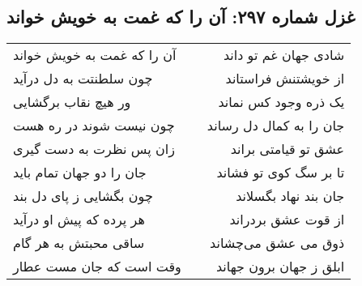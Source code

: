 \begin{center}
\section*{غزل شماره ۲۹۷: آن را که غمت به خویش خواند}
\label{sec:297}
\begin{longtable}{l p{0.5cm} r}
آن را که غمت به خویش خواند
&&
شادی جهان غم تو داند
\\
چون سلطنتت به دل درآید
&&
از خویشتنش فراستاند
\\
ور هیچ نقاب برگشایی
&&
یک ذره وجود کس نماند
\\
چون نیست شوند در ره هست
&&
جان را به کمال دل رساند
\\
زان پس نظرت به دست گیری
&&
عشق تو قیامتی براند
\\
جان را دو جهان تمام باید
&&
تا بر سگ کوی تو فشاند
\\
چون بگشایی ز پای دل بند
&&
جان بند نهاد بگسلاند
\\
هر پرده که پیش او درآید
&&
از قوت عشق بردراند
\\
ساقی محبتش به هر گام
&&
ذوق می عشق می‌چشاند
\\
وقت است که جان مست عطار
&&
ابلق ز جهان برون جهاند
\\
\end{longtable}
\end{center}
